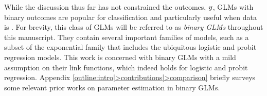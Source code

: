 While the discussion thus far has not constrained the outcomes, \(  \RespV*  \), GLMs with binary outcomes are popular for classification and particularly useful when data is \nonseparable.
For brevity, this class of GLMs will be referred to as \emph{binary GLMs} throughout this manuscript.
They contain several important families of models, such as a subset of the exponential family that includes the ubiquitous logistic and probit regression models.
This work is concerned with binary GLMs with a mild assumption on their link functions, which indeed holds for logistic and probit regression.
Appendix \ref{outline:intro|>contributions|>comparison} briefly surveys some relevant prior works on parameter estimation in binary GLMs.
 

